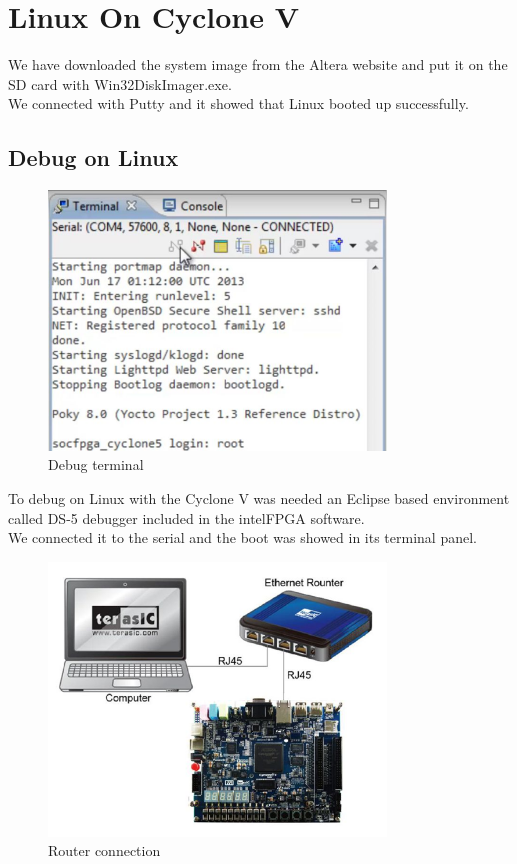 \chapter{Linux On Cyclone V}
\label{ch:linuxoncyclonev}

We have downloaded the system image from the Altera website and put it on the SD card with Win32DiskImager.exe.\\
We connected with Putty and it showed that Linux booted up successfully.

\section{Debug on Linux}
\begin{figure}[h]
	\centering		\includegraphics[width=0.8\textwidth]{img/debugterminal}
	\caption{Debug terminal}
    	\label{fig:debugterminal}
\end{figure}

To debug on Linux with the Cyclone V was needed an Eclipse based environment called DS-5 debugger included in the intelFPGA software.\\
We connected it to the serial and the boot was showed in its terminal panel.
\clearpage

\begin{figure}[h]
	\centering		\includegraphics[width=0.8\textwidth]{img/routerconf}
	\caption{Router connection}
    	\label{fig:routerconf}
\end{figure}

